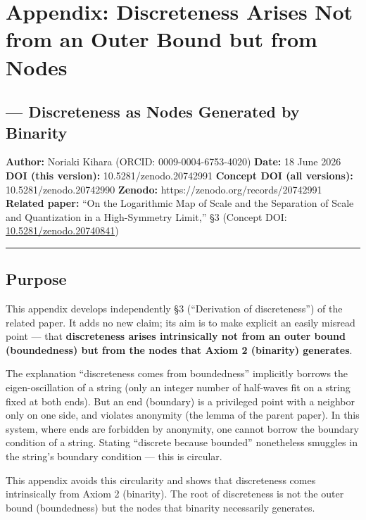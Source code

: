 \documentclass[11pt]{ltjsarticle}
\newcounter{none}
\begin{document}
\section{Appendix: Discreteness Arises Not from an Outer Bound but from
Nodes}\label{appendix-discreteness-arises-not-from-an-outer-bound-but-from-nodes}

\subsection{--- Discreteness as Nodes Generated by
Binarity}\label{discreteness-as-nodes-generated-by-binarity}

\textbf{Author:} Noriaki Kihara (ORCID: 0009-0004-6753-4020)
\textbf{Date:} 18 June 2026 \textbf{DOI (this version):}
10.5281/zenodo.20742991 \textbf{Concept DOI (all versions):}
10.5281/zenodo.20742990 \textbf{Zenodo:}
https://zenodo.org/records/20742991 \textbf{Related paper:} ``On the
Logarithmic Map of Scale and the Separation of Scale and Quantization in
a High-Symmetry Limit,'' §3 (Concept DOI:
\href{https://doi.org/10.5281/zenodo.20740841}{10.5281/zenodo.20740841})

\begin{center}\rule{0.5\linewidth}{0.5pt}\end{center}

\subsection{Purpose}\label{purpose}

This appendix develops independently §3 (``Derivation of discreteness'')
of the related paper. It adds no new claim; its aim is to make explicit
an easily misread point --- that \textbf{discreteness arises
intrinsically not from an outer bound (boundedness) but from the nodes
that Axiom 2 (binarity) generates}.

The explanation ``discreteness comes from boundedness'' implicitly
borrows the eigen-oscillation of a string (only an integer number of
half-waves fit on a string fixed at both ends). But an end (boundary) is
a privileged point with a neighbor only on one side, and violates
anonymity (the lemma of the parent paper). In this system, where ends
are forbidden by anonymity, one cannot borrow the boundary condition of
a string. Stating ``discrete because bounded'' nonetheless smuggles in
the string's boundary condition --- this is circular.

This appendix avoids this circularity and shows that discreteness comes
intrinsically from Axiom 2 (binarity). The root of discreteness is not
the outer bound (boundedness) but the nodes that binarity necessarily
generates.
\end{document}
